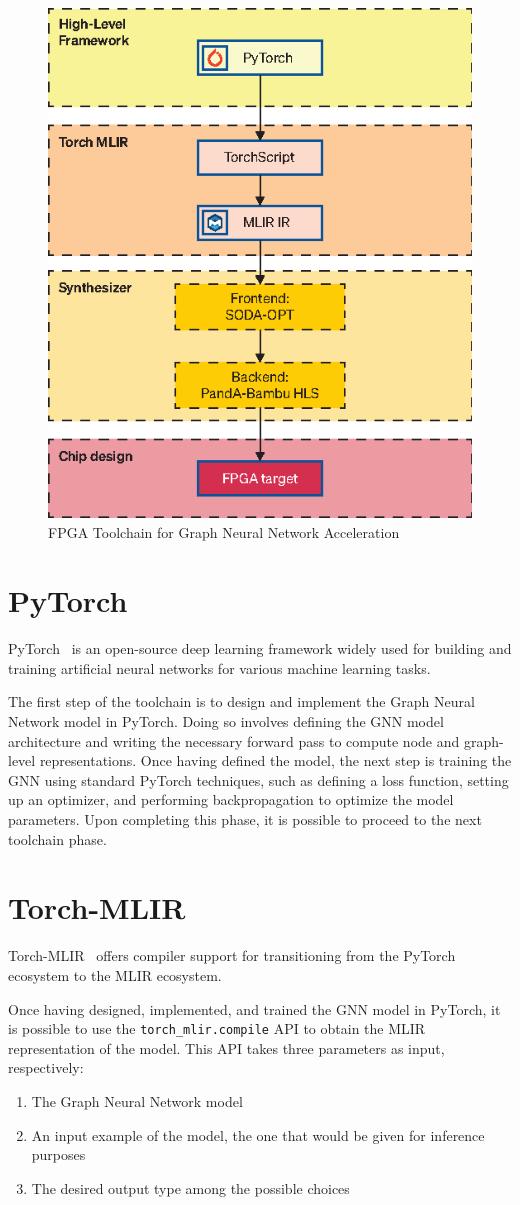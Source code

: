 \begin{figure}[t]
    \centering
    \includegraphics[height=0.6\textwidth]{Images/toolchain}
    \caption{FPGA Toolchain for Graph Neural Network Acceleration}
    \label{fig:toolchain}
\end{figure}

\section{PyTorch}
\label{sec:toolchain-pytorch}%

PyTorch~\cite{DBLP:journals/corr/abs-1912-01703} is an open-source deep learning framework widely used for building and training artificial neural networks for various machine learning tasks.

The first step of the toolchain is to design and implement the Graph Neural Network model in PyTorch.
Doing so involves defining the GNN model architecture and writing the necessary forward pass to compute node and graph-level representations.
Once having defined the model, the next step is training the GNN using standard PyTorch techniques, such as defining a loss function, setting up an optimizer, and performing backpropagation to optimize the model parameters.
Upon completing this phase, it is possible to proceed to the next toolchain phase.

\section{Torch-MLIR}
\label{sec:toolchain-torch_mlir}%

Torch-MLIR~\cite{torch_mlir} offers compiler support for transitioning from the PyTorch ecosystem to the MLIR ecosystem.

Once having designed, implemented, and trained the GNN model in PyTorch, it is possible to use the \texttt{torch\_mlir.compile} API to obtain the MLIR representation of the model.
This API takes three parameters as input, respectively:
\begin{enumerate}
    \item The Graph Neural Network model
    \item An input example of the model, the one that would be given for inference purposes
    \item The desired output type among the possible choices
\end{enumerate}

